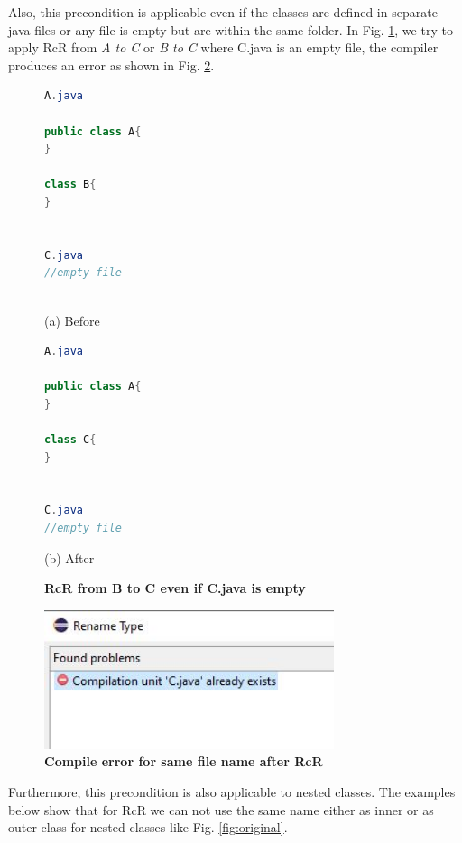 Also, this precondition is applicable even if the classes are defined in separate java files or any file is empty but are within the same folder. In Fig. \ref{fig:empty}, we try to apply RcR from \emph{A to C} or \emph{B to C} where C.java is an empty file, the compiler produces an error as shown in Fig. \ref{fig:efr}. 

\begin{figure}[th]
\centering
\begin{minipage}[t]{0.45\linewidth}
\begin{lstlisting}[language=java, basicstyle=\scriptsize\ttfamily,frame=single]
A.java

public class A{
}
	
class B{
}


C.java
//empty file
 
\end{lstlisting}
\centering(a) Before
\end{minipage}
\hfill
\begin{minipage}[t]{0.45\linewidth}
\begin{lstlisting}[language=java, basicstyle=\scriptsize\ttfamily,frame=single]
A.java

public class A{
}
	
class C{
}


C.java
//empty file

\end{lstlisting}
\centering(b) After
\end{minipage}
\caption{\textbf{RcR from B to C even if C.java is empty}}
\label{fig:empty}
\end{figure}

\begin{figure}[H]
\centerline{\includegraphics[width=85mm,scale=0.5]{EFE.jpg}}
\caption{\textbf{Compile error for same file name after RcR}}
\label{fig:efr}
\end{figure}


Furthermore, this precondition is also applicable to nested classes. The examples below show that for RcR we can not use the same name either as inner or as outer class for nested classes like Fig. \ref{fig:original}.

